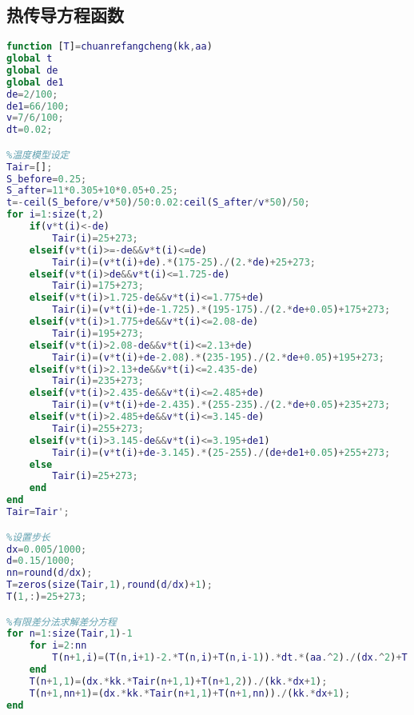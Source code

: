 \documentclass[12pt]{ctexart}
\numberwithin{figure}{section}
\numberwithin{table}{section}
\begin{document}
\subsection{热传导方程函数}
\begin{lstlisting}[language=MATLAB]
%热传导方程函数
function [T]=chuanrefangcheng(kk,aa)
global t
global de
global de1
de=2/100;
de1=66/100;
v=7/6/100;
dt=0.02;

%温度模型设定
Tair=[];
S_before=0.25;
S_after=11*0.305+10*0.05+0.25;
t=-ceil(S_before/v*50)/50:0.02:ceil(S_after/v*50)/50;
for i=1:size(t,2)
    if(v*t(i)<-de)
        Tair(i)=25+273;
    elseif(v*t(i)>=-de&&v*t(i)<=de)
        Tair(i)=(v*t(i)+de).*(175-25)./(2.*de)+25+273;
    elseif(v*t(i)>de&&v*t(i)<=1.725-de)
        Tair(i)=175+273;
    elseif(v*t(i)>1.725-de&&v*t(i)<=1.775+de)
        Tair(i)=(v*t(i)+de-1.725).*(195-175)./(2.*de+0.05)+175+273;
    elseif(v*t(i)>1.775+de&&v*t(i)<=2.08-de)
        Tair(i)=195+273;
    elseif(v*t(i)>2.08-de&&v*t(i)<=2.13+de)
        Tair(i)=(v*t(i)+de-2.08).*(235-195)./(2.*de+0.05)+195+273;
    elseif(v*t(i)>2.13+de&&v*t(i)<=2.435-de)
        Tair(i)=235+273;
    elseif(v*t(i)>2.435-de&&v*t(i)<=2.485+de)
        Tair(i)=(v*t(i)+de-2.435).*(255-235)./(2.*de+0.05)+235+273;
    elseif(v*t(i)>2.485+de&&v*t(i)<=3.145-de)
        Tair(i)=255+273;
    elseif(v*t(i)>3.145-de&&v*t(i)<=3.195+de1)
        Tair(i)=(v*t(i)+de-3.145).*(25-255)./(de+de1+0.05)+255+273;
    else
        Tair(i)=25+273;
    end
end
Tair=Tair';

%设置步长
dx=0.005/1000;
d=0.15/1000;
nn=round(d/dx);
T=zeros(size(Tair,1),round(d/dx)+1);
T(1,:)=25+273;

%有限差分法求解差分方程
for n=1:size(Tair,1)-1
    for i=2:nn
        T(n+1,i)=(T(n,i+1)-2.*T(n,i)+T(n,i-1)).*dt.*(aa.^2)./(dx.^2)+T(n,i);
    end
    T(n+1,1)=(dx.*kk.*Tair(n+1,1)+T(n+1,2))./(kk.*dx+1);
    T(n+1,nn+1)=(dx.*kk.*Tair(n+1,1)+T(n+1,nn))./(kk.*dx+1);
end

\end{lstlisting}
\end{document}
